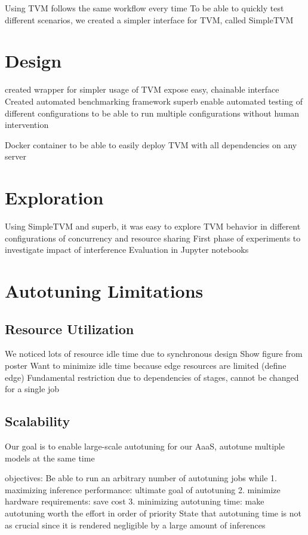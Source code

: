 Using TVM follows the same workflow every time
To be able to quickly test different scenarios, we created a simpler interface for TVM, called SimpleTVM

\section{Design}
created wrapper for simpler usage of TVM
expose easy, chainable interface
Created automated benchmarking framework superb
enable automated testing of different configurations to be able to run multiple configurations without human intervention

Docker container to be able to easily deploy TVM with all dependencies on any server

\section{Exploration}
Using SimpleTVM and superb, it was easy to explore TVM behavior in different configurations of concurrency and resource sharing
First phase of experiments to investigate impact of interference
Evaluation in Jupyter notebooks

\section{Autotuning Limitations}

\subsection{Resource Utilization}
We noticed lots of resource idle time due to synchronous design
Show figure from poster
Want to minimize idle time because edge resources are limited (define edge)
Fundamental restriction due to dependencies of stages, cannot be changed for a single job

\subsection{Scalability}
Our goal is to enable large-scale autotuning for our AaaS, autotune multiple models at the same time

objectives:
Be able to run an arbitrary number of autotuning jobs while
1. maximizing inference performance: ultimate goal of autotuning
2. minimize hardware requirements: save cost
3. minimizing autotuning time: make autotuning worth the effort
in order of priority
State that autotuning time is not as crucial since it is rendered negligible by a large amount of inferences

